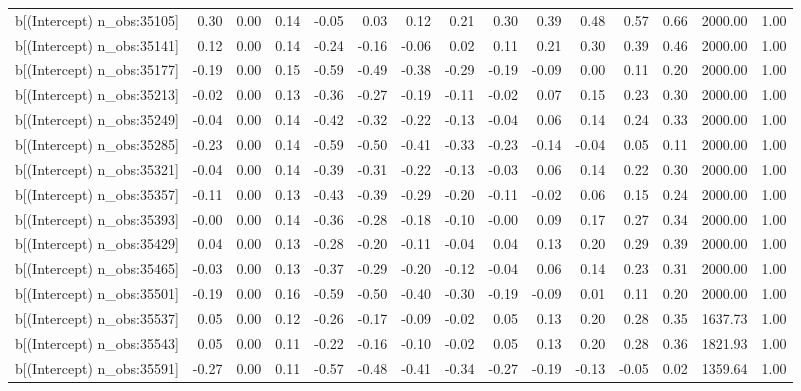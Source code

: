 \begin{table}[ht]
\begin{tabular}{rrrrrrrrrrrrrrr}
  b[(Intercept) n\_obs:35105] & 0.30 & 0.00 & 0.14 & -0.05 & 0.03 & 0.12 & 0.21 & 0.30 & 0.39 & 0.48 & 0.57 & 0.66 & 2000.00 & 1.00 \\ 
  b[(Intercept) n\_obs:35141] & 0.12 & 0.00 & 0.14 & -0.24 & -0.16 & -0.06 & 0.02 & 0.11 & 0.21 & 0.30 & 0.39 & 0.46 & 2000.00 & 1.00 \\ 
  b[(Intercept) n\_obs:35177] & -0.19 & 0.00 & 0.15 & -0.59 & -0.49 & -0.38 & -0.29 & -0.19 & -0.09 & 0.00 & 0.11 & 0.20 & 2000.00 & 1.00 \\ 
  b[(Intercept) n\_obs:35213] & -0.02 & 0.00 & 0.13 & -0.36 & -0.27 & -0.19 & -0.11 & -0.02 & 0.07 & 0.15 & 0.23 & 0.30 & 2000.00 & 1.00 \\ 
  b[(Intercept) n\_obs:35249] & -0.04 & 0.00 & 0.14 & -0.42 & -0.32 & -0.22 & -0.13 & -0.04 & 0.06 & 0.14 & 0.24 & 0.33 & 2000.00 & 1.00 \\ 
  b[(Intercept) n\_obs:35285] & -0.23 & 0.00 & 0.14 & -0.59 & -0.50 & -0.41 & -0.33 & -0.23 & -0.14 & -0.04 & 0.05 & 0.11 & 2000.00 & 1.00 \\ 
  b[(Intercept) n\_obs:35321] & -0.04 & 0.00 & 0.14 & -0.39 & -0.31 & -0.22 & -0.13 & -0.03 & 0.06 & 0.14 & 0.22 & 0.30 & 2000.00 & 1.00 \\ 
  b[(Intercept) n\_obs:35357] & -0.11 & 0.00 & 0.13 & -0.43 & -0.39 & -0.29 & -0.20 & -0.11 & -0.02 & 0.06 & 0.15 & 0.24 & 2000.00 & 1.00 \\ 
  b[(Intercept) n\_obs:35393] & -0.00 & 0.00 & 0.14 & -0.36 & -0.28 & -0.18 & -0.10 & -0.00 & 0.09 & 0.17 & 0.27 & 0.34 & 2000.00 & 1.00 \\ 
  b[(Intercept) n\_obs:35429] & 0.04 & 0.00 & 0.13 & -0.28 & -0.20 & -0.11 & -0.04 & 0.04 & 0.13 & 0.20 & 0.29 & 0.39 & 2000.00 & 1.00 \\ 
  b[(Intercept) n\_obs:35465] & -0.03 & 0.00 & 0.13 & -0.37 & -0.29 & -0.20 & -0.12 & -0.04 & 0.06 & 0.14 & 0.23 & 0.31 & 2000.00 & 1.00 \\ 
  b[(Intercept) n\_obs:35501] & -0.19 & 0.00 & 0.16 & -0.59 & -0.50 & -0.40 & -0.30 & -0.19 & -0.09 & 0.01 & 0.11 & 0.20 & 2000.00 & 1.00 \\ 
  b[(Intercept) n\_obs:35537] & 0.05 & 0.00 & 0.12 & -0.26 & -0.17 & -0.09 & -0.02 & 0.05 & 0.13 & 0.20 & 0.28 & 0.35 & 1637.73 & 1.00 \\ 
  b[(Intercept) n\_obs:35543] & 0.05 & 0.00 & 0.11 & -0.22 & -0.16 & -0.10 & -0.02 & 0.05 & 0.13 & 0.20 & 0.28 & 0.36 & 1821.93 & 1.00 \\ 
  b[(Intercept) n\_obs:35591] & -0.27 & 0.00 & 0.11 & -0.57 & -0.48 & -0.41 & -0.34 & -0.27 & -0.19 & -0.13 & -0.05 & 0.02 & 1359.64 & 1.00 \\ 

\end{tabular}
\end{table}
